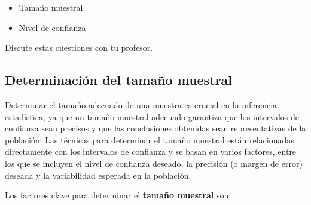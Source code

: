 \documentclass[
  letterpaper,
  DIV=11,
  numbers=noendperiod]{scrreprt}
\providecommand{\tightlist}{%
  \setlength{\itemsep}{0pt}\setlength{\parskip}{0pt}}\usepackage{longtable,booktabs,array}
\begin{document}
\begin{tcolorbox}
\begin{itemize}
  \begin{itemize}
  \tightlist
  \item
    Tamaño muestral
  \item
    Nivel de confianza
  \end{itemize}
\end{itemize}

Discute estas cuestiones con tu profesor.

\end{tcolorbox}

\hypertarget{determinaciuxf3n-del-tamauxf1o-muestral}{%
\subsection{Determinación del tamaño
muestral}\label{determinaciuxf3n-del-tamauxf1o-muestral}}

Determinar el tamaño adecuado de una muestra es crucial en la inferencia
estadística, ya que un tamaño muestral adecuado garantiza que los
intervalos de confianza sean precisos y que las conclusiones obtenidas
sean representativas de la población. Las técnicas para determinar el
tamaño muestral están relacionadas directamente con los intervalos de
confianza y se basan en varios factores, entre los que se incluyen el
nivel de confianza deseado, la precisión (o margen de error) deseada y
la variabilidad esperada en la población.

Los factores clave para determinar el \textbf{tamaño muestral} son:
\end{document}

